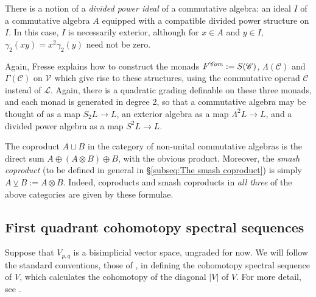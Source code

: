 \documentclass[11pt]{amsart} \renewcommand{\baselinestretch}{1.2}
\theoremstyle{plain}
\numberwithin{equation}{section} %
\theoremstyle{plain}
\numberwithin{equation}{chapter} %
\renewcommand{\to}{\longrightarrow}
\newcommand{\scrL}{\mathscr{L}}
\newcommand{\scrC}{\mathscr{C}}
\newcommand{\calV}{\mathcal{V}}
\newcommand{\citeBOX}[2][]{\cite[\mbox{#1}]{#2}}
\newcommand{\LieOperad}{{\scrL}}
\newcommand{\CommOperad}{{\scrC}}
\newcommand{\vect}[2]{\calV^{#1}_{#2}}
\newcommand{\algs}{{\scrC\!\textit{\normalfont\textit{om}}}}
\newcommand{\diag}[1]{|#1|}
\newcommand{\smashcoprod}{\veebar}%
\newcommand{\SubsectionOrSection}[1]{\subsection{#1}}
\begin{document}
\begin{Conventions and notation}
There is a notion of a \emph{divided power ideal} of a commutative algebra: an ideal $I$ of a commutative algebra $A$ equipped with a compatible divided power structure on $I$. In this case, $I$ is necessarily exterior, although for $x\in A$ and $y\in I$, $\gamma_2(xy)=x^2\gamma_2(y)$ need not be zero.

Again, Fresse \cite{FresseSimplicialAlgs.pdf} explains how to construct the monads $F^{\algs}:=S(\CommOperad)$, $\Lambda(\CommOperad)$ and $\Gamma(\CommOperad)$ on $\vect{}{}$ which give rise to these structures, using the commutative operad $\CommOperad$ instead of $\LieOperad$. Again, there is a quadratic grading definable on these three monads, and each monad is generated in degree 2, so that a commutative algebra may be thought of as a  map $S_2L\to L$, an exterior algebra as a map $\Lambda^2L\to L$, and a divided power algebra as a map $S^2L\to L$.

The coproduct $A\sqcup B$ in the category of non-unital commutative algebras is the direct sum $A\oplus (A\otimes B)\oplus B$, with the obvious product. Moreover, the \emph{smash coproduct} (to be defined in general in \S\ref{subseq:The smash coproduct}) is simply $A\smashcoprod B:=A\otimes B$. Indeed, coproducts and smash coproducts in \emph{all three} of the above categories are given by these formulae.

















\SubsectionOrSection{First quadrant cohomotopy spectral sequences}
Suppose that $V_{p,q}$ is a bisimplicial vector space, ungraded for now. We will follow the standard conventions, those of \cite{MR2245560}, in defining the cohomotopy spectral sequence of $V$, which calculates the cohomotopy of the diagonal $\diag{V} $ of $V$. For  more detail, see \citeBOX[\S1.15]{MR2245560}.   


\end{Conventions and notation}
\end{document}
